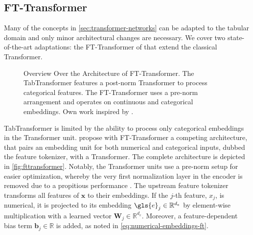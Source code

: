\subsection{FT-Transformer}\label{sec:fttransformer}

Many of the concepts in \cref{sec:transformer-networks} can be adapted to the tabular domain and only minor architectural changes are necessary. We cover two state-of-the-art adaptations: the FT-Transformer of \textcite[][4]{gorishniyRevisitingDeepLearning2021} that extend the classical Transformer.

\begin{figure}[ht]
    \hfill
    \hfill
    \hfill\null
    \caption[Overview Over the FT-Transformer Architecture]{Overview Over the Architecture of FT-Transformer. The TabTransformer features a post-norm Transformer to process categorical features. The FT-Transformer uses a pre-norm arrangement and operates on continuous and categorical embeddings. Own work inspired by \textcites[][2]{huangTabTransformerTabularData2020}[][4--5]{gorishniyRevisitingDeepLearning2021}.}
    \label{fig:tabular-transformer}
\end{figure}

TabTransformer is limited by the ability to process only categorical embeddings in the Transformer unit. \textcite[][5]{gorishniyRevisitingDeepLearning2021} propose with FT-Transformer a competing architecture, that pairs an embedding unit for both numerical and categorical inputs, dubbed the feature tokenizer, with a Transformer. The complete architecture is depicted in \cref{fig:fttransformer}. Notably, the Transformer units use a pre-norm setup for easier optimization, whereby the very first normalization layer in the encoder is removed due to a propitious performance \textcite[][17]{gorishniyRevisitingDeepLearning2021}. The upstream feature tokenizer transforms all features of $\mathbf{x}$ to their embeddings. If the $j$-th feature, $x_j$, is numerical, it is projected to its embedding $\gls{e}_j \in \mathbb{R}^{d_e}$ by element-wise multiplication with a learned vector $\mathbf{W}_j \in \mathbb{R}^{d_{e}}$. Moreover, a feature-dependent bias term $\mathbf{b}_j \in \mathbb{R}$ is added, as noted in \cref{eq:numerical-embeddings-ft}.

